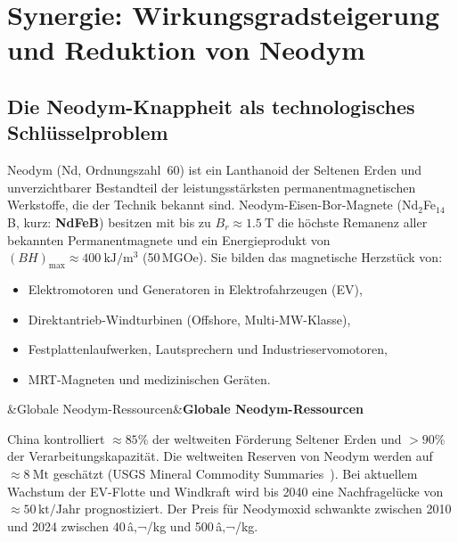 ﻿\documentclass[12pt, a4paper]{report}
\newenvironment{hinweis}[1][]{%
  \begin{hinweisframe}\sloppy%
  \ifx&#1&\else\textbf{#1}\par\smallskip\fi}{\end{hinweisframe}}
\theoremstyle{definition}
\theoremstyle{remark}
\begin{document}
\chapter{Synergie: Wirkungsgradsteigerung und Reduktion von Neodym}
\label{sec:synergie}

\section{Die Neodym-Knappheit als technologisches Schlüsselproblem}
\label{ssec:neodym_motivation}

Neodym (\textrm{Nd}, Ordnungszahl~60) ist ein Lanthanoid der Seltenen Erden und
unverzichtbarer Bestandteil der leistungsstärksten permanentmagnetischen
Werkstoffe, die der Technik bekannt sind. Neodym-Eisen-Bor-Magnete
(Nd$_2$Fe$_{14}$B, kurz: \textbf{NdFeB}) besitzen mit bis zu
$B_r \approx \SI{1.5}{\tesla}$ die höchste Remanenz aller bekannten
Permanentmagnete und ein Energieprodukt von
$(BH)_{\max} \approx \SI{400}{\kilo\joule\per\cubic\metre}$
(50\,MGOe). Sie bilden das magnetische Herzstück
von:
\begin{itemize}
  \item Elektromotoren und Generatoren in Elektrofahrzeugen (EV),
  \item Direktantrieb-Windturbinen (Offshore, Multi-MW-Klasse),
  \item Festplattenlaufwerken, Lautsprechern und Industrieservomotoren,
  \item MRT-Magneten und medizinischen Geräten.
\end{itemize}

\begin{hinweis}[Globale Neodym-Ressourcen]
  China kontrolliert $\approx 85\%$ der weltweiten Förderung Seltener Erden
  und $>90\%$ der Verarbeitungskapazität. Die weltweiten Reserven von
  Neodym werden auf $\approx \SI{8}{\mega\tonne}$ geschätzt
  (USGS Mineral Commodity Summaries~\cite{usgs2024}). Bei aktuellem Wachstum der
  EV-Flotte und Windkraft wird bis 2040 eine Nachfragelücke von
  $\approx 50\,\text{kt/Jahr}$ prognostiziert. Der
  Preis für Neodymoxid schwankte zwischen 2010 und 2024 zwischen
  40\,â‚¬/kg und 500\,â‚¬/kg.
\end{hinweis}
\end{document}
